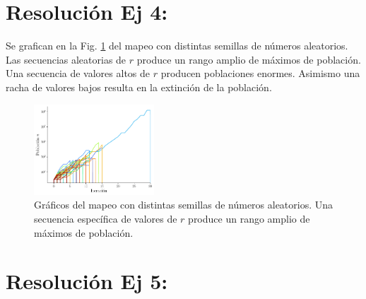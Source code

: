\documentclass[twocolumn,aps,prl]{revtex4-1}
\begin{document}
\section{Resolución Ej 4:}

Se grafican en la Fig. \ref{fig:scripts/ex4} del mapeo con distintas semillas de números aleatorios. Las secuencias aleatorias de $r$ produce un rango amplio de máximos de población. Una secuencia de valores altos de $r$ producen poblaciones enormes. Asimismo una racha de valores bajos resulta en la extinción de la población.

\begin{figure}[ht!]
    \centering
        \centering
        \includegraphics[width = 0.4\textwidth]{scripts/ex4.pdf}
        \caption{Gráficos del mapeo con distintas semillas de números aleatorios. Una secuencia específica de valores de $r$ produce un rango amplio de máximos de población.}
        \label{fig:scripts/ex4}
\end{figure}

% 
%                             
% 

\section{Resolución Ej 5:}
\end{document}
